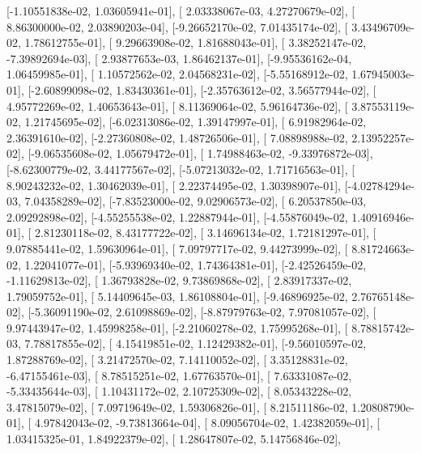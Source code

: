 \documentclass{article}
\begin{document}
       [-1.10551838e-02,  1.03605941e-01],
       [ 2.03338067e-03,  4.27270679e-02],
       [ 8.86300000e-02,  2.03890203e-04],
       [-9.26652170e-02,  7.01435174e-02],
       [ 3.43496709e-02,  1.78612755e-01],
       [ 9.29663908e-02,  1.81688043e-01],
       [ 3.38252147e-02, -7.39892694e-03],
       [ 2.93877653e-03,  1.86462137e-01],
       [-9.95536162e-04,  1.06459985e-01],
       [ 1.10572562e-02,  2.04568231e-02],
       [-5.55168912e-02,  1.67945003e-01],
       [-2.60899098e-02,  1.83430361e-01],
       [-2.35763612e-02,  3.56577944e-02],
       [ 4.95772269e-02,  1.40653643e-01],
       [ 8.11369064e-02,  5.96164736e-02],
       [ 3.87553119e-02,  1.21745695e-02],
       [-6.02313086e-02,  1.39147997e-01],
       [ 6.91982964e-02,  2.36391610e-02],
       [-2.27360808e-02,  1.48726506e-01],
       [ 7.08898988e-02,  2.13952257e-02],
       [-9.06535608e-02,  1.05679472e-01],
       [ 1.74988463e-02, -9.33976872e-03],
       [-8.62300779e-02,  3.44177567e-02],
       [-5.07213032e-02,  1.71716563e-01],
       [ 8.90243232e-02,  1.30462039e-01],
       [ 2.22374495e-02,  1.30398907e-01],
       [-4.02784294e-03,  7.04358289e-02],
       [-7.83523000e-02,  9.02906573e-02],
       [ 6.20537850e-03,  2.09292898e-02],
       [-4.55255538e-02,  1.22887944e-01],
       [-4.55876049e-02,  1.40916946e-01],
       [ 2.81230118e-02,  8.43177722e-02],
       [ 3.14696134e-02,  1.72181297e-01],
       [ 9.07885441e-02,  1.59630964e-01],
       [ 7.09797717e-02,  9.44273999e-02],
       [ 8.81724663e-02,  1.22041077e-01],
       [-5.93969340e-02,  1.74364381e-01],
       [-2.42526459e-02, -1.11629813e-02],
       [ 1.36793828e-02,  9.73869868e-02],
       [ 2.83917337e-02,  1.79059752e-01],
       [ 5.14409645e-03,  1.86108804e-01],
       [-9.46896925e-02,  2.76765148e-02],
       [-5.36091190e-02,  2.61098869e-02],
       [-8.87979763e-02,  7.97081057e-02],
       [ 9.97443947e-02,  1.45998258e-01],
       [-2.21060278e-02,  1.75995268e-01],
       [ 8.78815742e-03,  7.78817855e-02],
       [ 4.15419851e-02,  1.12429382e-01],
       [-9.56010597e-02,  1.87288769e-02],
       [ 3.21472570e-02,  7.14110052e-02],
       [ 3.35128831e-02, -6.47155461e-03],
       [ 8.78515251e-02,  1.67763570e-01],
       [ 7.63331087e-02, -5.33435644e-03],
       [ 1.10431172e-02,  2.10725309e-02],
       [ 8.05343228e-02,  3.47815079e-02],
       [ 7.09719649e-02,  1.59306826e-01],
       [ 8.21511186e-02,  1.20808790e-01],
       [ 4.97842043e-02, -9.73813664e-04],
       [ 8.09056704e-02,  1.42382059e-01],
       [ 1.03415325e-01,  1.84922379e-02],
       [ 1.28647807e-02,  5.14756846e-02],
\end{document}
